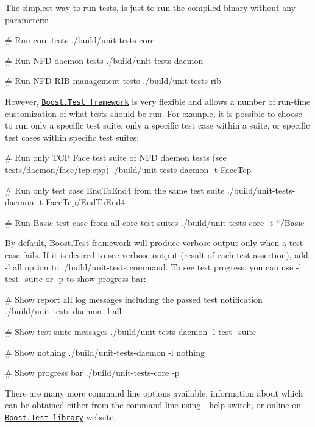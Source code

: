 The simplest way to run tests, is just to run the compiled binary without any parameters\+: \begin{DoxyVerb}# Run core tests
./build/unit-tests-core

# Run  NFD daemon tests
./build/unit-tests-daemon

# Run NFD RIB management tests
./build/unit-tests-rib
\end{DoxyVerb}


However, \href{http://www.boost.org/doc/libs/1_48_0/libs/test/doc/html/}{\tt Boost.\+Test framework} is very flexible and allows a number of run-\/time customization of what tests should be run. For example, it is possible to choose to run only a specific test suite, only a specific test case within a suite, or specific test cases within specific test suites\+: \begin{DoxyVerb}# Run only TCP Face test suite of NFD daemon tests (see tests/daemon/face/tcp.cpp)
./build/unit-tests-daemon -t FaceTcp

# Run only test case EndToEnd4 from the same test suite
./build/unit-tests-daemon -t FaceTcp/EndToEnd4

# Run Basic test case from all core test suites
./build/unit-tests-core -t */Basic
\end{DoxyVerb}


By default, Boost.\+Test framework will produce verbose output only when a test case fails. If it is desired to see verbose output (result of each test assertion), add {\ttfamily -\/l all} option to {\ttfamily ./build/unit-\/tests} command. To see test progress, you can use {\ttfamily -\/l test\+\_\+suite} or {\ttfamily -\/p} to show progress bar\+: \begin{DoxyVerb}# Show report all log messages including the passed test notification
./build/unit-tests-daemon -l all

# Show test suite messages
./build/unit-tests-daemon -l test_suite

# Show nothing
./build/unit-tests-daemon -l nothing

# Show progress bar
./build/unit-tests-core -p
\end{DoxyVerb}


There are many more command line options available, information about which can be obtained either from the command line using {\ttfamily -\/-\/help} switch, or online on \href{http://www.boost.org/doc/libs/1_48_0/libs/test/doc/html/}{\tt Boost.\+Test library} website. 